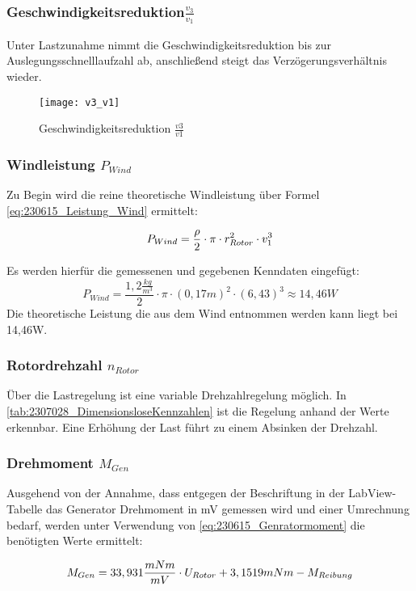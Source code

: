 \subsubsection*{Geschwindigkeitsreduktion$\frac{v_3}{v_1}$}
Unter Lastzunahme nimmt die Geschwindigkeitsreduktion bis zur Auslegungsschnelllaufzahl ab, anschließend steigt das Verzögerungsverhältnis wieder. 
\begin{figure}[H]
    \centering
    \texttt{[image: v3\_v1]}
    \caption{Geschwindigkeitsreduktion $\frac{v3}{v1}$}
    \label{fig:Geschwindigkeitsreduktion}
\end{figure}

\subsubsection*{Windleistung $P_{Wind}$}
Zu Begin wird die reine theoretische Windleistung über Formel \autoref{eq:230615_Leistung_Wind} ermittelt:

\begin{equation}
    \centering
    P_{Wind} = \frac{\rho}{2} \cdot \pi \cdot r_{Rotor}^2 \cdot v_1^3
    \label{eq:230615_Leistung_Wind}
\end{equation}

Es werden hierfür die gemessenen und gegebenen Kenndaten eingefügt:
$$P_{Wind} = \frac{1,2 \frac{kg}{m^3}}{2} \cdot \pi \cdot (0,17 m)^2 \cdot (6,43)^3 \approx 14,46 W$$
Die theoretische Leistung die aus dem Wind entnommen werden kann liegt bei 14,46W.

\subsubsection*{Rotordrehzahl $n_{Rotor}$}
Über die Lastregelung ist eine variable Drehzahlregelung möglich. In \autoref{tab:2307028_DimensionsloseKennzahlen} ist die Regelung anhand der Werte erkennbar. Eine Erhöhung der Last führt zu einem Absinken der Drehzahl.
\subsubsection*{Drehmoment $M_{Gen}$}
Ausgehend von der Annahme,
 dass entgegen der Beschriftung in der LabView-Tabelle das Generator Drehmoment in mV gemessen wird und einer Umrechnung bedarf, 
 werden unter Verwendung von \autoref{eq:230615_Genratormoment} die benötigten Werte ermittelt:

\begin{equation}
    \centering
    M_{Gen} = 33,931\frac{mNm}{mV} \cdot U_{Rotor} + 3,1519 mNm - M_{Reibung}
    \label{eq:230615_Genratormoment}
\end{equation}

